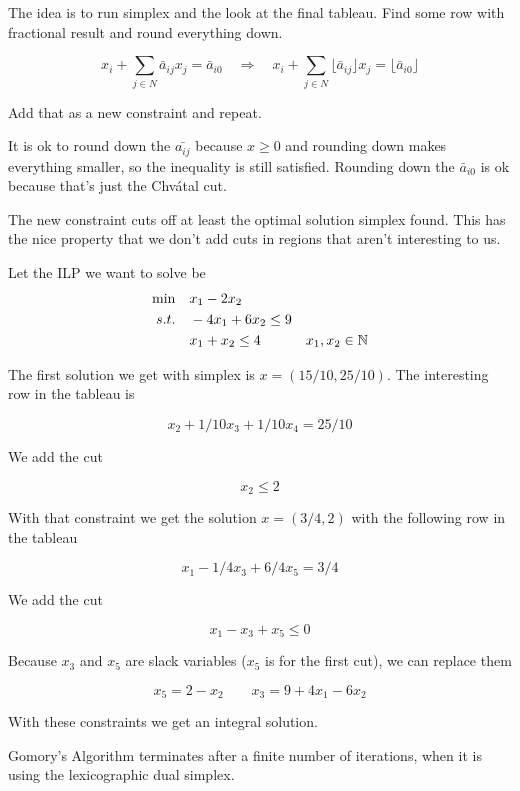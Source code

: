 The idea is to run simplex and the look at the final tableau. Find some row with fractional result and round everything down. 

\[x_i + \sum_{j\in N} \bar a_{ij} x_j = \bar a_{i0} \quad \Rightarrow \quad x_i + \sum_{j\in N} \lfloor\bar a_{ij}\rfloor x_j = \lfloor\bar a_{i0}\rfloor\]

Add that as a new constraint and repeat. 

It is ok to round down the $\bar{a_{ij}}$ because $x\geq 0$ and rounding down makes everything smaller, so the inequality is still satisfied. Rounding down the $\bar a_{i0}$ is ok because that's just the Chv\'{a}tal cut.

The new constraint cuts off at least the optimal solution simplex found. This has the nice property that we don't add cuts in regions that aren't interesting to us.

\begin{Ex} Let the ILP we want to solve be
\begin{align*}
\min \quad& x_1-2x_2\\
s.t. \quad& -4x_1 +6x_2 \leq 9\\
& x_1+x_2 \leq 4
&x_1,x_2 \in \mathbb{N}
\end{align*}

The first solution we get with simplex is $x=(15/10,25/10)$. The interesting row in the tableau is

\[x_2+1/10 x_3 + 1/10x_4 = 25/10\]

We add the cut

\[x_2 \leq 2\]

With that constraint we get the solution $x=(3/4,2)$ with the following row in the tableau

\[x_1-1/4x_3 +6/4 x_5 = 3/4\]

We add the cut

\[x_1-x_3+x_5\leq 0\]

Because $x_3$ and $x_5$ are slack variables ($x_5$ is for the first cut), we can replace them 

\[x_5 = 2-x_2\qquad x_3=9+4x_1-6x_2\]

With these constraints we get an integral solution.
\end{Ex}

\begin{thm} Gomory's Algorithm terminates after a finite number of iterations, when it is using the lexicographic dual simplex.
\end{thm}

